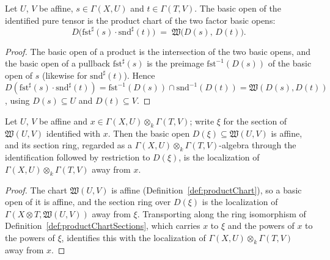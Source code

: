 \begin{lemma}
  \label{lem:basicOpen_productChartSections_tmul}
  \leanok
  Let \(U\), \(V\) be affine, \(s \in \Gamma(X,U)\) and \(t \in \Gamma(T,V)\). The basic open of
  the identified pure tensor is the product chart of the two factor basic opens:
  \[
    D\bigl(\mathrm{fst}^\sharp(s) \cdot \mathrm{snd}^\sharp(t)\bigr)
      \;=\; \mathfrak W\bigl(D(s),\, D(t)\bigr).
  \]
\end{lemma}
\begin{proof}
  \leanok
  The basic open of a product is the intersection of the two basic opens, and the basic open of a
  pullback \(\mathrm{fst}^\sharp(s)\) is the preimage \(\mathrm{fst}^{-1}(D(s))\) of the basic open
  of \(s\) (likewise for \(\mathrm{snd}^\sharp(t)\)). Hence
  \(D(\mathrm{fst}^\sharp(s) \cdot \mathrm{snd}^\sharp(t)) = \mathrm{fst}^{-1}(D(s)) \cap \mathrm{snd}^{-1}(D(t))
  = \mathfrak W(D(s), D(t))\), using \(D(s) \subseteq U\) and \(D(t) \subseteq V\).
\end{proof}

\begin{theorem}
  \label{thm:isLocalization_away_basicOpen_productChartSections}
  \leanok
  Let \(U\), \(V\) be affine and \(x \in \Gamma(X,U) \otimes_k \Gamma(T,V)\); write \(\xi\) for
  the section of \(\mathfrak W(U,V)\) identified with \(x\). Then the basic open
  \(D(\xi) \subseteq \mathfrak W(U,V)\) is affine, and its section ring, regarded as a
  \(\Gamma(X,U) \otimes_k \Gamma(T,V)\)-algebra through the identification followed by restriction
  to \(D(\xi)\), is the localization of \(\Gamma(X,U) \otimes_k \Gamma(T,V)\) away from \(x\).
\end{theorem}
\begin{proof}
  \leanok
  The chart \(\mathfrak W(U,V)\) is affine (Definition~\ref{def:productChart}), so a basic open of
  it is affine, and the section ring over \(D(\xi)\) is the localization of
  \(\Gamma(X \otimes T, \mathfrak W(U,V))\) away from \(\xi\). Transporting along the ring
  isomorphism of Definition~\ref{def:productChartSections}, which carries \(x\) to \(\xi\) and the
  powers of \(x\) to the powers of \(\xi\), identifies this with the localization of
  \(\Gamma(X,U) \otimes_k \Gamma(T,V)\) away from \(x\).
\end{proof}

